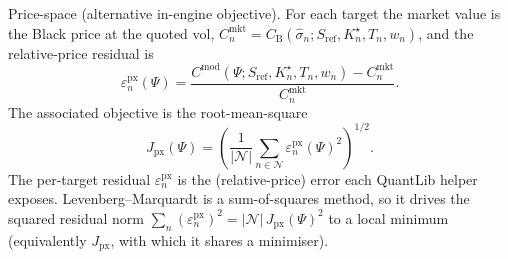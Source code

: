 \documentclass[a4paper, 11pt, reqno]{amsart}
\makeatletter
\def\paragraph{\@startsection{paragraph}{4}%
	\z@\z@{-\fontdimen2\font}%
	{\normalfont\bfseries}}
\makeatother
\begin{document}
			\paragraph{Price-space (alternative in-engine objective).} For each target the market value is the
				Black price at the quoted vol, $C^{\mathrm{mkt}}_n = C_{\mathrm{B}}(\hat\sigma_n; S_{\mathrm{ref}}, K^\star_n, T_n, w_n)$,
				and the relative-price residual is
				\begin{equation}\label{eq:resid-price}
					\varepsilon^{\mathrm{px}}_n(\Psi)
					= \frac{C^{\mathrm{mod}}(\Psi; S_{\mathrm{ref}}, K^\star_n, T_n, w_n) - C^{\mathrm{mkt}}_n}{C^{\mathrm{mkt}}_n}.
				\end{equation}
				The associated objective is the root-mean-square
				\begin{equation}\label{eq:obj-price}
					J_{\mathrm{px}}(\Psi)
					= \left( \frac{1}{|\mathcal{N}|} \sum_{n\in\mathcal{N}} \varepsilon^{\mathrm{px}}_n(\Psi)^2 \right)^{1/2}.
				\end{equation}
				The per-target residual $\varepsilon^{\mathrm{px}}_n$ is the (relative-price) error each
				QuantLib helper exposes. Levenberg--Marquardt \parencite{marquardt1963} is a sum-of-squares
				method, so it drives the squared residual norm
				$\sum_{n}(\varepsilon^{\mathrm{px}}_n)^2 = |\mathcal{N}|\,J_{\mathrm{px}}(\Psi)^2$ to a local
				minimum (equivalently $J_{\mathrm{px}}$, with which it shares a minimiser).
				
\end{document}
